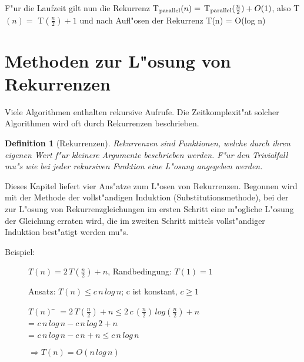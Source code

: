 \documentclass[draft,12pt]{scrreprt}
\theoremstyle{break}
\newtheorem{definition}{Definition}
\begin{document}
$$  $$

F"ur die Laufzeit gilt nun die Rekurrenz T$_{\textup{parallel}}(n) =$ T$_{\textup{parallel}}(\frac{n}{2}) + O(1)$,
also T$(n)=$ T$(\frac{n}{2})+1$ und nach Aufl"osen der Rekurrenz T(n) = O(log n)

\section{Methoden zur L"osung von Rekurrenzen}
Viele Algorithmen enthalten rekursive Aufrufe. Die Zeitkomplexit"at solcher Algorithmen wird oft durch Rekurrenzen beschrieben.
\begin{definition}[Rekurrenzen]
Rekurrenzen sind Funktionen, welche durch ihren eigenen Wert f"ur kleinere Argumente beschrieben werden. F"ur den Trivialfall mu"s wie
bei jeder rekursiven Funktion eine L"osung angegeben werden.
\end{definition}
Dieses Kapitel liefert vier Ans"atze zum L"osen von Rekurrenzen.
%
%
Begonnen wird mit der Methode der vollst"andigen Induktion (Substitutionsmethode),
bei der zur L"osung von Rekurrenzgleichungen im ersten Schritt eine m"ogliche L"osung der Gleichung erraten wird,
die im zweiten Schritt mittels vollst"andiger Induktion best"atigt werden mu"s.		

	\begin{description}
		\item [Beispiel:] $T(n) = 2\, T\left(\frac{n}{2}\right) + n$, Randbedingung: $T(1)=1$

		Ansatz: $T(n) \leq c\, n\, log\,n$; c ist konstant, $c \geq 1$
		\begin{tabbing}
			$T(n)$ \= $= 2\, T\left(\frac{n}{2}\right)+n\leq 2\, c\,\left(\frac{n}{2}\right)\, log\left(\frac{n}{2}\right)+n$\\
			\> = $c\, n\, log\, n-c\, n\, log\,2+n$\\
			\> = $c\, n\, log\, n-c\, n+n \leq c\, n\, log\, n$\\
		\end{tabbing}
		$\Rightarrow T(n)=O(n\, log\,n)$
	\end{description}
\end{document}
